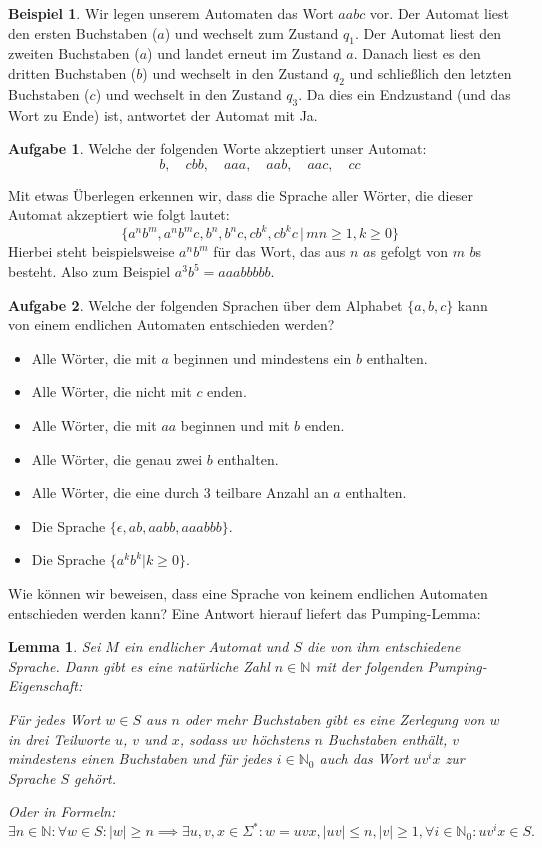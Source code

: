 \documentclass[a4paper,ngerman,12pt]{scrartcl}
\newcommand{\IN}{\mathbb{N}}
\newcommand{\INo}{\mathbb{N}_0}
\newcommand{\abs}[1]{\left|#1\right|}
\theoremstyle{definition}
\newtheorem{bsp}[defn]{Beispiel}
\newtheorem{aufg}{Aufgabe}
\theoremstyle{plain}
\newtheorem{lemma}[defn]{Lemma}
\theoremstyle{remark}
\begin{document}
\begin{bsp}
	Wir legen unserem Automaten das Wort $aabc$ vor. Der Automat liest den ersten Buchstaben ($a$) und wechselt zum Zustand $q_1$. Der Automat liest den zweiten Buchstaben ($a$) und landet erneut im Zustand $a$. Danach liest es den dritten Buchstaben ($b$) und wechselt in den Zustand $q_2$ und schließlich den letzten Buchstaben ($c$) und wechselt in den Zustand $q_3$. Da dies ein Endzustand (und das Wort zu Ende) ist, antwortet der Automat mit Ja.
\end{bsp}

\begin{aufg}
	Welche der folgenden Worte akzeptiert unser Automat:
		\[b,\quad cbb,\quad aaa,\quad aab,\quad aac,\quad cc\]
\end{aufg}

Mit etwas Überlegen erkennen wir, dass die Sprache aller Wörter, die dieser Automat akzeptiert wie folgt lautet:
	\[\{a^nb^m, a^nb^mc, b^n, b^nc, cb^k, cb^kc \,|\, mn \geq 1, k \geq 0\}\]
Hierbei steht beispielsweise $a^nb^m$ für das Wort, das aus $n$ $a$s gefolgt von $m$ $b$s besteht. Also zum Beispiel $a^3b^5 = aaabbbbb$.

\begin{aufg}
	Welche der folgenden Sprachen über dem Alphabet $\{a,b,c\}$ kann von einem endlichen Automaten entschieden werden?
	\begin{itemize}
		\item Alle Wörter, die mit $a$ beginnen und mindestens ein $b$ enthalten.
		\item Alle Wörter, die nicht mit $c$ enden.
		\item Alle Wörter, die mit $aa$ beginnen und mit $b$ enden.
		\item Alle Wörter, die genau zwei $b$ enthalten.
		\item Alle Wörter, die eine durch $3$ teilbare Anzahl an $a$ enthalten.
		\item Die Sprache $\{\epsilon,ab,aabb,aaabbb\}$.
		\item Die Sprache $\{a^kb^k | k \geq 0\}$.
	\end{itemize}
\end{aufg}

Wie können wir beweisen, dass eine Sprache von keinem endlichen Automaten entschieden werden kann? Eine Antwort hierauf liefert das Pumping-Lemma:

\begin{lemma}
	Sei $M$ ein endlicher Automat und $S$ die von ihm entschiedene Sprache. Dann gibt es eine natürliche Zahl $n \in \IN$ mit der folgenden Pumping-Eigenschaft:
	
	Für jedes Wort $w \in S$ aus $n$ oder mehr Buchstaben gibt es eine Zerlegung von $w$ in drei Teilworte $u$, $v$ und $x$, sodass $uv$ höchstens $n$ Buchstaben enthält, $v$ mindestens einen Buchstaben und für jedes $i \in \INo$ auch das Wort $uv^ix$ zur Sprache $S$ gehört. 
	
	Oder in Formeln:
		\[\exists n \in \IN: \forall w \in S: \abs{w} \geq n \implies \exists u,v,x \in \Sigma^*: w=uvx, \abs{uv} \leq n, \abs{v} \geq 1, \forall i \in \INo: uv^ix \in S.\]
\end{lemma}
\end{document}
